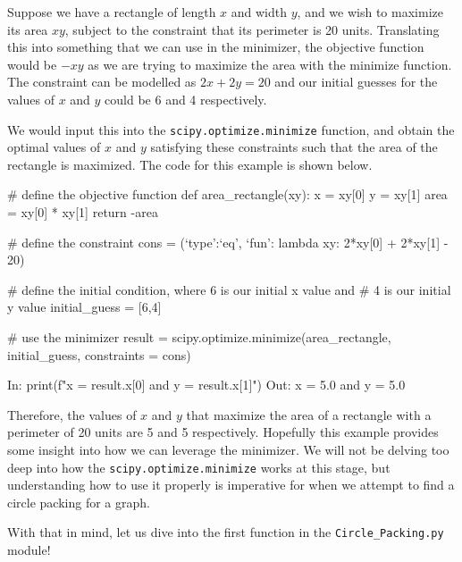 \begin{flushleft}
Suppose we have a rectangle of length $x$ and width $y$, and we wish to maximize its area $xy$, subject to the constraint that its perimeter is 20 units. Translating this into something that we can use in the minimizer, the objective function would be $-xy$ as we are trying to maximize the area with the minimize function. The constraint can be modelled as $2x+2y = 20$ and our initial guesses for the values of $x$ and $y$ could be 6 and 4 respectively. 
\end{flushleft}

\begin{flushleft}
We would input this into the \texttt{scipy.optimize.minimize} function, and obtain the optimal values of $x$ and $y$ satisfying these constraints such that the area of the rectangle is maximized. The code for this example is shown below.
\end{flushleft} 

\begin{code}
    # define the objective function
    def area_rectangle(xy):
        x = xy[0]
        y = xy[1]
        area = xy[0] * xy[1]
        return -area
    
    # define the constraint
    cons = ({`type':`eq', `fun': lambda xy: 2*xy[0] + 2*xy[1] - 20})
    
    # define the initial condition, where 6 is our initial x value and 
    # 4 is our initial y value
    initial_guess = [6,4]
    
    # use the minimizer
    result = scipy.optimize.minimize(area_rectangle, initial_guess, constraints = cons)
\end{code}

\begin{code}
    In: print(f"x = {result.x[0]} and y = {result.x[1]}")
    Out: x = 5.0 and y = 5.0    
\end{code}

\begin{flushleft}
Therefore, the values of $x$ and $y$ that maximize the area of a rectangle with a perimeter of 20 units are 5 and 5 respectively. Hopefully this example provides some insight into how we can leverage the minimizer. We will not be delving too deep into how the \texttt{scipy.optimize.minimize} works at this stage, but understanding how to use it properly is imperative for when we attempt to find a circle packing for a graph.
\end{flushleft}

\begin{flushleft}
With that in mind, let us dive into the first function in the \texttt{Circle\_Packing.py} module!
\end{flushleft}

